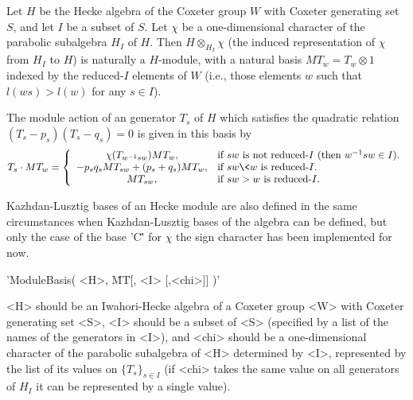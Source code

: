 

Let $H$  be the  Hecke algebra  of the Coxeter  group $W$  with Coxeter
generating set  $S$, and let $I$  be a subset  of $S$. Let $\chi$  be a
one-dimensional  character of  the parabolic  subalgebra $H_I$  of $H$.
Then $H\otimes_{H_I}\chi$  (the induced  representation of  $\chi$ from
$H_I$  to  $H$)  is  naturally  a  $H$-module,  with  a  natural  basis
$MT_w=T_w\otimes 1$ indexed  by the reduced-$I$ elements  of $W$ (i.e.,
those elements $w$ such that $l(ws)>l(w)$ for any $s\in I$).

The module  action of  an generator  $T_s$ of  $H$ which  satisfies the
quadratic  relation  $(T_s-p_s)(T_s-q_s)=0$  is  given  in  this  basis
by\:  $$T_s\cdot MT_w=\left\{\begin{array}{cl}
\chi(T_{w^{-1}sw})MT_w,&
\text{if  $sw$ is  not reduced-$I$ (then $w^{-1}sw\in  I$).}\\
-p_s q_sMT_{sw}+(p_s+q_s)MT_w,&
\text{if $sw\<w$ is reduced-$I$.}\\
MT_{sw},& \text{if $sw>w$ is reduced-$I$.}\\
\end{array}\right.$$

Kazhdan-Lusztig bases of  an Hecke module are also defined  in the same
circumstances when Kazhdan-Lusztig bases of the algebra can be defined,
but only the case  of the base 'C\'' for $\chi$  the sign character has
been implemented for now.


'ModuleBasis( <H>, \"MT\"  [, <I> [,<chi>]] )'

<H> should  be an  Iwahori-Hecke algebra  of a  Coxeter group  <W> with
Coxeter generating set <S>, <I> should be a subset of <S> (specified by
a list of  the names of the  generators in <I>), and <chi>  should be a
one-dimensional character of the parabolic subalgebra of <H> determined
by <I>, represented by the list of its values on $\{T_s\}_{s\in I}$ (if
<chi>  takes the  same  value on  all  generators of  $H_I$  it can  be
represented by a single value).

